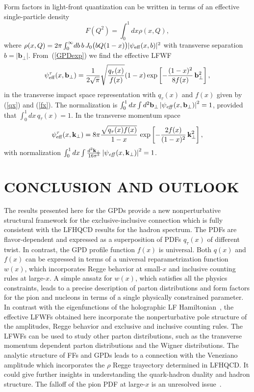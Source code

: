 \documentclass[aps,prl,reprint,groupedaddress, preprintnumbers]{revtex4-1}
\def\be{\begin{equation}}
\def\ee{\end{equation}}
\newcommand{\req}[1]{(\ref{#1})}
\newcommand{\mbf}[1]{\mathbf{#1}}
\begin{document}
Form factors in light-front quantization can be written in terms of an effective single-particle density~\cite{Soper:1976jc}
\be
F(Q^2) = \int_0^1 dx \rho(x, Q),
\ee
where $\rho(x,Q) =2 \pi \int_0^\infty \!  db \,  b \, J_0\big(b Q (1-x)\big) \vert \psi_{\rm eff} (x,b)\vert^2$ with transverse separation $b = \vert \mbf{b}_\perp \vert$.
From~\req{GPDexp} we find the effective LFWF
\be \label{LFWFb}
\psi_{\rm eff}^\tau(x, \mbf{b}_\perp) = \frac{1}{2 \sqrt{\pi}} \sqrt{\frac{q_\tau(x)}{f(x)}} 
 (1-x) \exp \left[ - \frac{(1-x)^2 }{8 f(x) } \, \mbf{b}_\perp^2\right],
\ee
in the transverse impact space representation with $q_\tau(x)$ and $f(x)$ given by \req{qx} and \req{fx}. The normalization is
$\int_0^1 dx \int d^2\mbf{b}_\perp \left \vert  \psi_{\it eff}(x, \mbf{b}_\perp) \right\vert^2 = 1$, provided that $\int_0^1 dx \, q_\tau(x) = 1$.
In the transverse momentum space 
\be  \label{LFWFk}
\psi_{\rm eff}^\tau(x, \mbf{k}_\perp) 
= 8 \pi \frac{ \sqrt{q_\tau(x) f(x) }}{1-x} \,
\exp\left[ -  \frac{2 f(x)}{(1-x)^2} \, \mbf{k}_\perp^2 \right],
\ee
with normalization $\int_0^1 dx \int \frac{d^2\mbf{k}_\perp}{16 \pi^3} \left\vert  \psi_{\it eff}(x, \mbf{k}_\perp) \right\vert^2=1$.





\section{CONCLUSION AND OUTLOOK}

The results presented here for the GPDs provide a new nonperturbative structural framework for the exclusive-inclusive connection which is fully consistent with the LFHQCD results for the hadron spectrum. The PDFs are flavor-dependent and expressed as a superposition of PDFs $q_\tau(x)$ of different twist. In contrast, the GPD profile function $f(x)$ is universal. Both $q(x)$ and $f(x)$ can be expressed in terms of a universal reparametrization function $w(x)$, which incorporates Regge behavior at small-$x$ and  inclusive counting rules at large-$x$. A simple ansatz for $w(x)$, which satisfies all the physics constraints, leads to a precise description of parton distributions and form factors for the pion and nucleons in terms of a single physically constrained parameter.  In contrast with the eigenfunctions of the holographic LF Hamiltonian~\cite{Brodsky:2014yha}, the effective LFWFs obtained here incorporate the nonperturbative pole structure of the amplitudes, Regge behavior and exclusive and inclusive counting rules. The LFWFs  can be used to study other parton distributions, such as the transverse momentum dependent parton distributions and the Wigner distributions. The analytic structure of FFs and GPDs leads to a connection with the Veneziano amplitude  which incorporates the $\rho$ Regge trayectory determined in LFHQCD. It could give further insights in understanding the quark-hadron duality and hadron structure. The falloff of the pion PDF at large-$x$ is an unresolved issue~\cite{Holt:2010vj}. 
\end{document}

